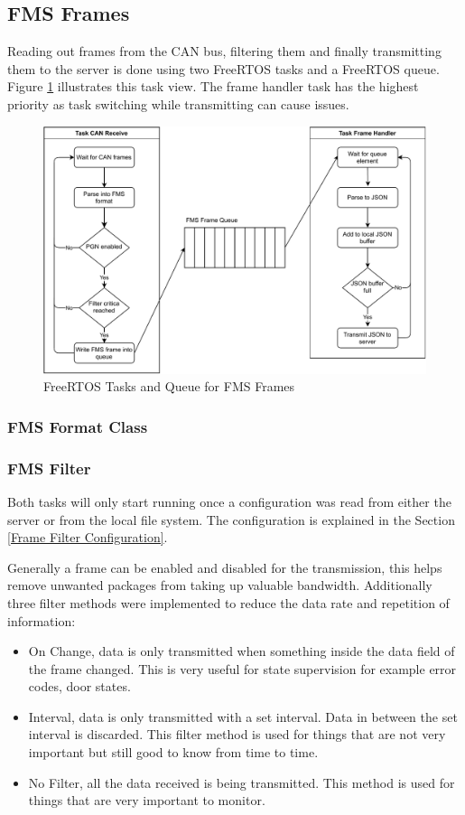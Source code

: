 \newpage
\subsection{FMS Frames} \label{FMS Frame Handler}
Reading out frames from the CAN bus, filtering them and finally transmitting them to the server is done using two FreeRTOS tasks and a FreeRTOS queue. Figure \ref{fig:fms-software} illustrates this task view. The frame handler task has the highest priority as task switching while transmitting can cause issues.
\begin{figure}[h!]
	\centering
	\includegraphics[width=\textwidth]{images/fms-software}
	\caption{FreeRTOS Tasks and Queue for FMS Frames}
	\label{fig:fms-software}
\end{figure}
\subsubsection{FMS Format Class}

\subsubsection{FMS Filter}
Both tasks will only start running once a configuration was read from either the server or from the local file system. The configuration is explained in the Section \ref{Frame Filter Configuration}.

Generally a frame can be enabled and disabled for the transmission, this helps remove unwanted packages from taking up valuable bandwidth. Additionally three filter methods were implemented to reduce the data rate and repetition of information:
\begin{itemize}
		\item On Change, data is only transmitted when something inside the data field of the frame changed. This is very useful for state supervision for example error codes, door states. 
		\item Interval, data is only transmitted with a set interval. Data in between the set interval is discarded. This filter method is used for things that are not very important but still good to know from time to time.
		\item No Filter, all the data received is being transmitted. This method is used for things that are very important to monitor.
\end{itemize}


